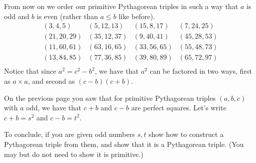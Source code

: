 \documentclass[12pt]{exam}
\begin{document}
\begin{questions}
  \newpage
  \question From now on we order our primitive Pythagorean triples in such a way that $a$ is odd and $b$ is even (rather than $a\leq b$ like before).
  \begin{equation*}
    \begin{array}{llll}
      ( 3, 4, 5) & ( 5,12,13) & (15, 8,17) & ( 7,24,25) \\
      (21,20,29) & (35,12,37) & ( 9,40,41) & (45,28,53) \\
      (11,60,61) & (63,16,65) & (33,56,65) & (55,48,73) \\
      (13,84,85) & (77,36,85) & (39,80,89) & (65,72,97) \\
    \end{array}
  \end{equation*}
  Notice that since $a^2=c^2-b^2$, we have that $a^2$ can be factored in two ways, first as $a\times a$, and second as $(c-b)(c+b)$.
  \newpage
  \question On the previous page you saw that for primitive Pythagorean triples $(a,b,c)$ with $a$ odd, we have that $c+b$ and $c-b$ are perfect squares. Let's write $c+b=s^2$ and $c-b=t^2$.
  
  To conclude, if you are given odd numbers $s,t$ show how to construct a Pythagorean triple from them, and show that it is a Pythagorean triple. (You may but do not need to show it is primitive.)
\end{questions}
\end{document}
